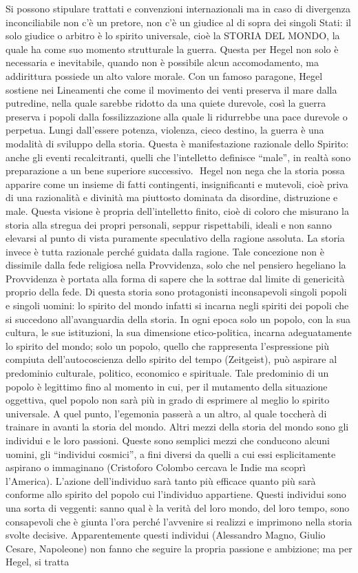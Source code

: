 \documentclass[a4paper,12pt,oneside,openany]{book}%
\begin{document}
Si possono stipulare trattati e convenzioni internazionali ma in caso di divergenza inconciliabile non c’è un pretore, non c’è un giudice al di sopra dei singoli Stati: il solo giudice o arbitro è lo spirito universale, cioè la STORIA DEL MONDO, la quale ha come suo momento strutturale la guerra. Questa per Hegel non solo è necessaria e inevitabile, quando non è possibile alcun accomodamento, ma addirittura possiede un alto valore morale. Con un famoso paragone, Hegel sostiene nei Lineamenti che come il movimento dei venti preserva il mare dalla putredine, nella quale sarebbe ridotto da una quiete durevole, così la guerra preserva i popoli dalla fossilizzazione alla quale li ridurrebbe una pace durevole o perpetua. Lungi dall’essere potenza, violenza, cieco destino, la guerra è una modalità di sviluppo della storia. Questa è manifestazione razionale dello Spirito: anche gli eventi recalcitranti, quelli che l’intelletto definisce “male”, in realtà sono preparazione a un bene superiore successivo.  Hegel non nega che la storia possa apparire come un insieme di fatti contingenti, insignificanti e mutevoli, cioè priva di una razionalità e divinità ma piuttosto dominata da disordine, distruzione e male. Questa visione è propria dell’intelletto finito, cioè di coloro che misurano la storia alla stregua dei propri personali, seppur rispettabili, ideali e non sanno elevarsi al punto di vista puramente speculativo della ragione assoluta. La storia invece è tutta razionale perché guidata dalla ragione. Tale concezione non è dissimile dalla fede religiosa nella Provvidenza, solo che nel pensiero hegeliano la Provvidenza è portata alla forma di sapere che la sottrae dal limite di genericità proprio della fede. Di questa storia sono protagonisti inconsapevoli singoli popoli e singoli uomini: lo spirito del mondo infatti si incarna negli spiriti dei popoli che si succedono all’avanguardia della storia. In ogni epoca solo un popolo, con la sua cultura, le sue istituzioni, la sua dimensione etico-politica, incarna adeguatamente lo spirito del mondo; solo un popolo, quello che rappresenta l’espressione più compiuta dell’autocoscienza dello spirito del tempo (Zeitgeist), può aspirare al predominio culturale, politico, economico e spirituale. Tale predominio di un popolo è legittimo fino al momento in cui, per il mutamento della situazione oggettiva, quel popolo non sarà più in grado di esprimere al meglio lo spirito universale. A quel punto, l’egemonia passerà a un altro, al quale toccherà di trainare in avanti la storia del mondo. Altri mezzi della storia del mondo sono gli individui e le loro passioni. Queste sono semplici mezzi che conducono alcuni uomini, gli “individui cosmici”, a fini diversi da quelli a cui essi esplicitamente aspirano o immaginano (Cristoforo Colombo cercava le Indie ma scoprì l’America). L’azione dell’individuo sarà tanto più efficace quanto più sarà conforme allo spirito del popolo cui l’individuo appartiene. Questi individui sono una sorta di veggenti: sanno qual è la verità del loro mondo, del loro tempo, sono consapevoli che è giunta l’ora perché l’avvenire si realizzi e imprimono nella storia svolte decisive. Apparentemente questi individui (Alessandro Magno, Giulio Cesare, Napoleone) non fanno che seguire la propria passione e ambizione; ma per Hegel, si tratta 
\end{document}
